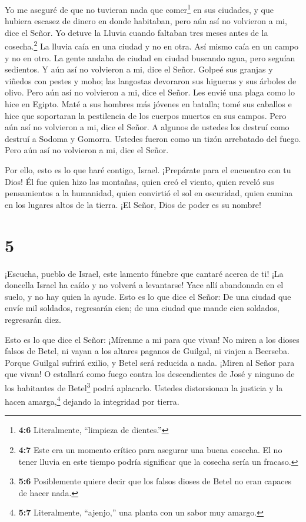  Yo me aseguré de que no tuvieran nada que comer\footnote{\textbf{4:6}
  Literalmente, ``limpieza de dientes.''} en sus ciudades, y que hubiera
escasez de dinero en donde habitaban, pero aún así no volvieron a mi,
dice el Señor.  Yo detuve la Lluvia cuando faltaban tres
meses antes de la cosecha.\footnote{\textbf{4:7} Este era un momento
  crítico para asegurar una buena cosecha. El no tener lluvia en este
  tiempo podría significar que la cosecha sería un fracaso.} La lluvia
caía en una ciudad y no en otra. Así mismo caía en un campo y no en
otro.  La gente andaba de ciudad en ciudad buscando agua,
pero seguían sedientos. Y aún así no volvieron a mi, dice el Señor.
 Golpeé sus granjas y viñedos con pestes y moho; las
langostas devoraron sus higueras y sus árboles de olivo. Pero aún así no
volvieron a mi, dice el Señor.  Les envié una plaga como lo
hice en Egipto. Maté a sus hombres más jóvenes en batalla; tomé sus
caballos e hice que soportaran la pestilencia de los cuerpos muertos en
sus campos. Pero aún así no volvieron a mi, dice el Señor. 
A algunos de ustedes los destruí como destruí a Sodoma y Gomorra.
Ustedes fueron como un tizón arrebatado del fuego. Pero aún así no
volvieron a mi, dice el Señor.

 Por ello, esto es lo que haré contigo, Israel. ¡Prepárate
para el encuentro con tu Dios!  Él fue quien hizo las
montañas, quien creó el viento, quien reveló sus pensamientos a la
humanidad, quien convirtió el sol en oscuridad, quien camina en los
lugares altos de la tierra. ¡El Señor, Dios de poder es su nombre!

\hypertarget{section-4}{%
\section{5}\label{section-4}}

 ¡Escucha, pueblo de Israel, este lamento fúnebre que
cantaré acerca de ti!  ¡La doncella Israel ha caído y no
volverá a levantarse! Yace allí abandonada en el suelo, y no hay quien
la ayude.  Esto es lo que dice el Señor: De una ciudad que
envíe mil soldados, regresarán cien; de una ciudad que mande cien
soldados, regresarán diez.

 Esto es lo que dice el Señor: ¡Mírenme a mi para que vivan!
 No miren a los dioses falsos de Betel, ni vayan a los
altares paganos de Guilgal, ni viajen a Beerseba. Porque Guilgal sufrirá
exilio, y Betel será reducida a nada.  ¡Miren al Señor para
que vivan! O estallará como fuego contra los descendientes de José y
ninguno de los habitantes de Betel\footnote{\textbf{5:6} Posiblemente
  quiere decir que los falsos dioses de Betel no eran capaces de hacer
  nada.} podrá aplacarlo.  Ustedes distorsionan la justicia
y la hacen amarga,\footnote{\textbf{5:7} Literalmente, ``ajenjo,'' una
  planta con un sabor muy amargo.} dejando la integridad por tierra.

